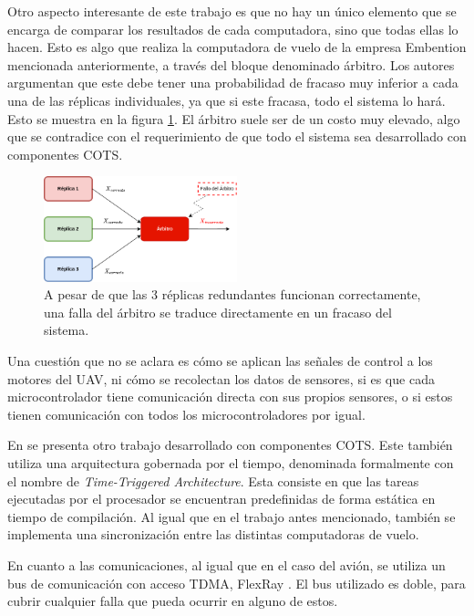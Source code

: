 Otro aspecto interesante de este trabajo es que no hay un único elemento que se encarga de comparar los resultados de cada computadora, sino que todas ellas lo hacen. Esto es algo que realiza la computadora de vuelo de la empresa Embention mencionada anteriormente, a través del bloque denominado árbitro. Los autores argumentan que este debe tener una probabilidad de fracaso muy inferior a cada una de las réplicas individuales, ya que si este fracasa, todo el sistema lo hará. Esto se muestra en la figura \ref{fig:falla_arbitro}. El árbitro suele ser de un costo muy elevado, algo que se contradice con el requerimiento de que todo el sistema sea desarrollado con componentes COTS.

\begin{figure}[htb]
    \centering
    \includegraphics[width=0.5\textwidth]{img/falla_arbitro.png}
    \caption{A pesar de que las 3 réplicas redundantes funcionan correctamente, una falla del árbitro se traduce directamente en un fracaso del sistema.}
    \label{fig:falla_arbitro}
\end{figure}

Una cuestión que no se aclara es cómo se aplican las señales de control a los motores del UAV, ni cómo se recolectan los datos de sensores, si es que cada microcontrolador tiene comunicación directa con sus propios sensores, o si estos tienen comunicación con todos los microcontroladores por igual.

En \cite{zhang2020architecture} se presenta otro trabajo desarrollado con componentes COTS. Este también utiliza una arquitectura gobernada por el tiempo, denominada formalmente con el nombre de \textit{Time-Triggered Architecture}. Esta consiste en que las tareas ejecutadas por el procesador se encuentran predefinidas de forma estática en tiempo de compilación. Al igual que en el trabajo antes mencionado, también se implementa una sincronización entre las distintas computadoras de vuelo.

En cuanto a las comunicaciones, al igual que en el caso del avión, se utiliza un bus de comunicación con acceso TDMA, FlexRay \cite{nxpAN12233}. El bus utilizado es doble, para cubrir cualquier falla que pueda ocurrir en alguno de estos. 

